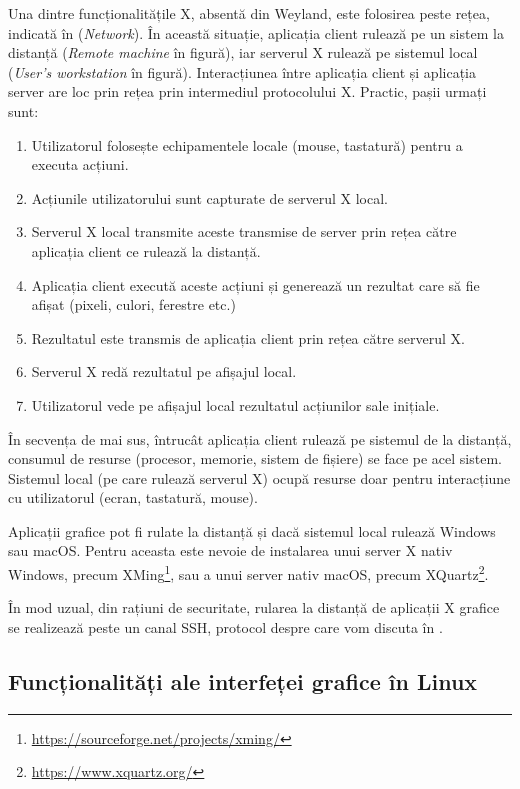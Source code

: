 Una dintre funcționalitățile X, absentă din Weyland, este folosirea peste rețea, indicată în  (\textit{Network}). În această situație, aplicația client rulează pe un sistem la distanță (\textit{Remote machine} în figură), iar serverul X rulează pe sistemul local (\textit{User's workstation} în figură). Interacțiunea între aplicația client și aplicația server are loc prin rețea prin intermediul protocolului X. Practic, pașii urmați sunt:
\begin{enumerate}
  \item Utilizatorul folosește echipamentele locale (mouse, tastatură) pentru a executa acțiuni.
  \item Acțiunile utilizatorului sunt capturate de serverul X local.
  \item Serverul X local transmite aceste transmise de server prin rețea către aplicația client ce rulează la distanță.
  \item Aplicația client execută aceste acțiuni și generează un rezultat care să fie afișat (pixeli, culori, ferestre etc.)
  \item Rezultatul este transmis de aplicația client prin rețea către serverul X.
  \item Serverul X redă rezultatul pe afișajul local.
  \item Utilizatorul vede pe afișajul local rezultatul acțiunilor sale inițiale.
\end{enumerate}

În secvența de mai sus, întrucât aplicația client rulează pe sistemul de la distanță, consumul de resurse (procesor, memorie, sistem de fișiere) se face pe acel sistem. Sistemul local (pe care rulează serverul X) ocupă resurse doar pentru interacțiune cu utilizatorul (ecran, tastatură, mouse).

Aplicații grafice pot fi rulate la distanță și dacă sistemul local rulează Windows sau macOS. Pentru aceasta este nevoie de instalarea unui server X nativ Windows, precum XMing\footnote{\url{https://sourceforge.net/projects/xming/}}, sau a unui server nativ macOS, precum XQuartz\footnote{\url{https://www.xquartz.org/}}.

În mod uzual, din rațiuni de securitate, rularea la distanță de aplicații X grafice se realizează peste un canal SSH, protocol despre care vom discuta în .

\subsection{Funcționalități ale interfeței grafice în Linux}
\label{sec:ui:linux-gui-features}

